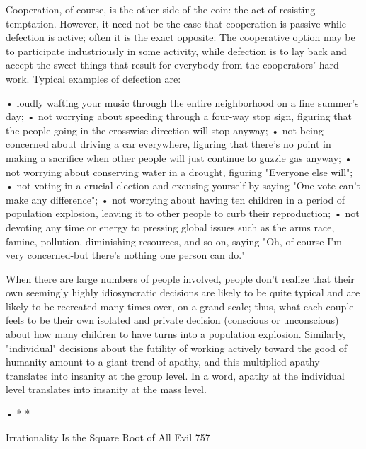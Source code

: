 Cooperation, of course, is the other side of the coin: the act of resisting temptation.
However, it need not be the case that cooperation is passive while defection is active;
often it is the exact opposite: The cooperative option may be to participate
industriously in some activity, while defection is to lay back and accept the sweet
things that result for everybody from the cooperators' hard work. Typical examples of
defection are:

   • loudly wafting your music through the entire neighborhood on a fine
     summer's day;
   • not worrying about speeding through a four-way stop sign, figuring that the
     people going in the crosswise direction will stop anyway;
   • not being concerned about driving a car everywhere, figuring that there's no
     point in making a sacrifice when other people will just continue to guzzle gas
     anyway;
   • not worrying about conserving water in a drought, figuring "Everyone else
     will";
   • not voting in a crucial election and excusing yourself by saying "One vote
     can't make any difference";
   • not worrying about having ten children in a period of population explosion,
     leaving it to other people to curb their reproduction;
   • not devoting any time or energy to pressing global issues such as the arms
     race, famine, pollution, diminishing resources, and so on, saying "Oh, of
     course I'm very concerned-but there's nothing one person can do."

   When there are large numbers of people involved, people don't realize that their
own seemingly highly idiosyncratic decisions are likely to be quite typical and are
likely to be recreated many times over, on a grand scale; thus, what each couple feels
to be their own isolated and private decision (conscious or unconscious) about how
many children to have turns into a population explosion. Similarly, "individual"
decisions about the futility of working actively toward the good of humanity amount
to a giant trend of apathy, and this multiplied apathy translates into insanity at the
group level. In a word, apathy at the individual level translates into insanity at the
mass level.

                                    •          *   *




Irrationality Is the Square Root of All Evil                                         757

